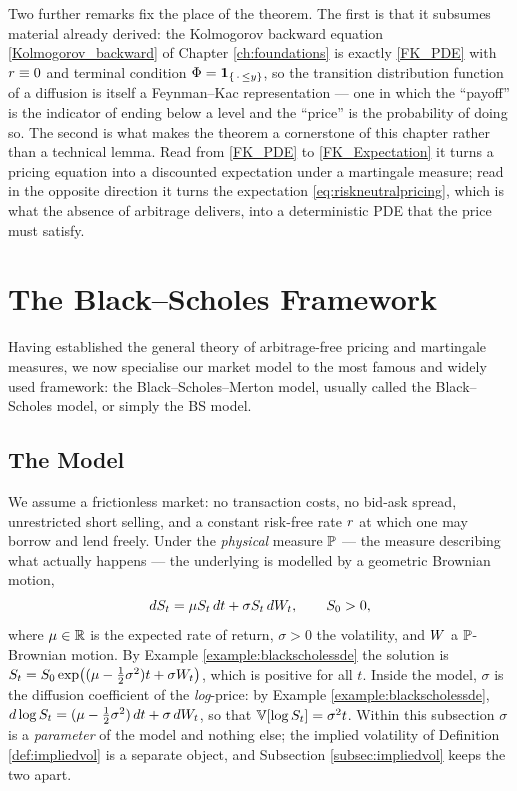 Two further remarks fix the place of the theorem. The first is that it subsumes material already
derived: the Kolmogorov backward equation \eqref{Kolmogorov_backward} of Chapter
\ref{ch:foundations} is exactly \eqref{FK_PDE} with $r \equiv 0$ and terminal condition
$\Phi = \mathbf{1}_{\{\,\cdot\, \le y\}}$, so the transition distribution function of a
diffusion is itself a Feynman--Kac representation --- one in which the ``payoff'' is the indicator of
ending below a level and the ``price'' is the probability of doing so. The second is what makes the
theorem a cornerstone of this chapter rather than a technical lemma. Read from
\eqref{FK_PDE} to \eqref{FK_Expectation} it turns a pricing equation into a discounted expectation
under a martingale measure; read in the opposite direction it turns the expectation
\eqref{eq:riskneutralpricing}, which is what the absence of arbitrage delivers, into a deterministic
PDE that the price must satisfy. 

\section{The Black--Scholes Framework}\label{sec:blackscholes}

Having established the general theory of arbitrage-free pricing and martingale measures, we now specialise our market model to the most famous and widely used framework: the Black--Scholes--Merton model, usually called the Black--Scholes model, or simply the BS model.

\vspace{-0.3cm}

\subsection{The Model}
\label{subsec:bs_model}

We assume a frictionless market: no transaction costs, no bid-ask spread, unrestricted short 
selling, and a constant risk-free rate $r$ at which one may borrow and lend freely. Under the 
\emph{physical} measure $\mathbb{P}$ --- the measure describing what actually happens --- the underlying is 
modelled by a geometric Brownian motion,
\begin{equation} \label{eq:BS_SDE_P}
    dS_t = \mu S_t \, dt + \sigma S_t \, dW_t, \qquad S_0 > 0,
\end{equation}
where $\mu \in \mathbb{R}$ is the expected rate of return, $\sigma>0$ the volatility, and $W$ a 
$\mathbb{P}$-Brownian motion. By Example \ref{example:blackscholessde} the solution is 
$S_t = S_0\exp\bigl((\mu-\tfrac12\sigma^2)t + \sigma W_t\bigr)$, which is positive for all 
$t$. Inside the model, $\sigma$ is the diffusion coefficient of the \emph{log}-price:
by Example \ref{example:blackscholessde}, $d\log S_t = (\mu-\tfrac12\sigma^2)\,dt + \sigma\,dW_t$,
so that $\mathbb{V}[\log S_t] = \sigma^2 t$. Within this subsection $\sigma$ is a \emph{parameter} of
the model and nothing else; the implied volatility of Definition \ref{def:impliedvol} is a separate
object, and Subsection \ref{subsec:impliedvol} keeps the two apart.





